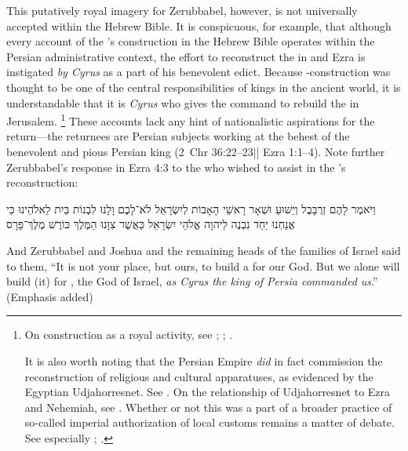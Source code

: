 This putatively royal imagery for Zerubbabel, however, is not universally accepted within the Hebrew Bible. It is conspicuous, for example, that although every account of the \secondtemple's construction in the Hebrew Bible operates within the Persian administrative context, the effort to reconstruct the \temple in \chronicles and Ezra is instigated \emph{by Cyrus} as a part of his benevolent edict. Because \temple-construction was thought to be one of the central responsibilities of kings in the ancient world, it is understandable that it is \emph{Cyrus} who gives the command to rebuild the \temple in Jerusalem.%
    \footnote{On \temple construction as a royal activity, see
        \cite{kapelrud_orientalia1963};
        \cite{petersen_cbq1974};
        \cite{laato_zaw1994}.

        It is also worth noting that the Persian Empire \emph{did} in fact commission the reconstruction of religious and cultural apparatuses, as evidenced by the Egyptian Udjahorresnet. See 
            \cite{lloyd_jea1982}. On the relationship of Udjahorresnet to Ezra and Nehemiah, see 
            \cite{blenkinsopp_jbl1987}.
        Whether or not this was a part of a broader practice of so-called imperial authorization of local customs remains a matter of debate. See especially
            \cite{frei_frei1984};
            \cite{frei_watts2001}.}
These accounts lack any hint of nationalistic aspirations for the return---the returnees are Persian subjects working at the behest of the benevolent and pious Persian king (2~Chr 36:22--23|| Ezra 1:1--4). Note further Zerubbabel's response in Ezra 4:3 to the  who wished to assist in the \temple's reconstruction:
\begin{hebrewtext}
    וַיֹּאמֶר לָהֶם זְרֻבָּבֶל וְיֵשׁוּעַ וּשְׁאָר רָאשֵׁי הָאָבוֹת לְיִשְׂרָאֵל לֹא־לָכֶם וָלָנוּ לִבְנוֹת בַּיִת לֵאלֹהֵינוּ כִּי אֲנַחְנוּ יַחַד נִבְנֶה לַיהוָה אֱלֹהֵי יִשְׂרָאֵל כַּאֲשֶׁר צִוָּנוּ הַמֶּלֶךְ כּוֹרֶשׁ מֶלֶךְ־פָּרָס
\end{hebrewtext}
\begin{translation}
    And Zerubbabel and Joshua and the remaining heads of the families of Israel said to them, ``It is not your place, but ours, to build a \temple for our God. But we alone will build (it) for \yahweh, the God of Israel, \emph{as Cyrus the king of Persia commanded us}.'' (Emphasis added)
\end{translation}
\noindent
